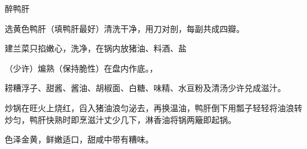 \begin{recipe}{醉鸭肝}

\ingredients


\cooking

\step 选黄色鸭肝（填鸭肝最好）清洗干净，用刀对剖，每副共成四瓣。

\step 建兰菜只掐嫩心，洗净，在锅内放猪油、料酒、盐

（少许）煸熟（保持脆性）在盘内作底。，

\step 耢糟浮子、甜酱、酱油、胡椒面、白糖、味精、水亘粉及清汤少许兑成滋汁。

\step 炒锅在旺火上烧红，舀入猪油浪匀泌去，再换温油，鸭肝倒下用瓢子轻轻将油浪转炒匀，鸭肝快熟时即烹滋汁丈少几下，淋香油将锅两簸即起锅。

\notes

色泽金黄，鲜嫩适口，甜咸中带有糟味。

\end{recipe}

